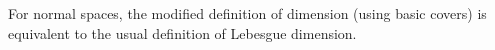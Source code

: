 For normal spaces, the modified definition of dimension (using basic covers) is equivalent to the usual definition of Lebesgue dimension.
